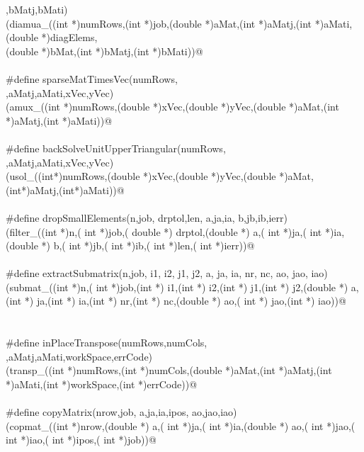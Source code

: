 \documentclass[12pt]{article}
\begin{document}
\begin{flushleft}
\begin{minipage}{\linewidth}
\begin{list}{}{}
\mbox{}\verb@bMat,bMatj,bMati) \@\\
\mbox{}\verb@(diamua_((int *)numRows,(int *)job,(double *)aMat,(int *)aMatj,(int *)aMati,(double *)diagElems, \@\\
\mbox{}\verb@(double *)bMat,(int *)bMatj,(int *)bMati))@\\
\mbox{}\verb@@\\
\mbox{}\verb@#define sparseMatTimesVec(numRows, \@\\
\mbox{}\verb@aMat,aMatj,aMati,xVec,yVec) \@\\
\mbox{}\verb@(amux_((int *)numRows,(double *)xVec,(double *)yVec,(double *)aMat,(int *)aMatj,(int *)aMati))@\\
\mbox{}\verb@@\\
\mbox{}\verb@#define backSolveUnitUpperTriangular(numRows, \@\\
\mbox{}\verb@aMat,aMatj,aMati,xVec,yVec) \@\\
\mbox{}\verb@(usol_((int*)numRows,(double *)xVec,(double *)yVec,(double *)aMat,(int*)aMatj,(int*)aMati))@\\
\mbox{}\verb@@\\
\mbox{}\verb@#define dropSmallElements(n,job, drptol,len, a,ja,ia, b,jb,ib,ierr)\@\\
\mbox{}\verb@(filter_((int *)n,( int *)job,( double *) drptol,(double *) a,( int *)ja,( int *)ia,(double *) b,( int *)jb,( int *)ib,( int *)len,( int *)ierr))@\\
\mbox{}\verb@@\\
\mbox{}\verb@#define extractSubmatrix(n,job, i1, i2, j1, j2, a, ja, ia, nr, nc, ao,  jao, iao)\@\\
\mbox{}\verb@(submat_((int *)n,( int *)job,(int *) i1,(int *) i2,(int *) j1,(int *) j2,(double *) a,(int *) ja,(int *) ia,(int *) nr,(int *) nc,(double *) ao,( int *)       jao,(int *) iao))@\\
\mbox{}\verb@@\\
\mbox{}\verb@@\\
\mbox{}\verb@#define inPlaceTranspose(numRows,numCols, \@\\
\mbox{}\verb@aMat,aMatj,aMati,workSpace,errCode) \@\\
\mbox{}\verb@(transp_((int *)numRows,(int *)numCols,(double *)aMat,(int *)aMatj,(int *)aMati,(int *)workSpace,(int *)errCode))@\\
\mbox{}\verb@@\\
\mbox{}\verb@#define copyMatrix(nrow,job, a,ja,ia,ipos, ao,jao,iao)\@\\
\mbox{}\verb@(copmat_((int *)nrow,(double *) a,( int *)ja,( int *)ia,(double *) ao,( int *)jao,( int *)iao,( int *)ipos,( int *)job))@\\

\end{list}
\end{minipage}
\end{flushleft}
\end{document}
